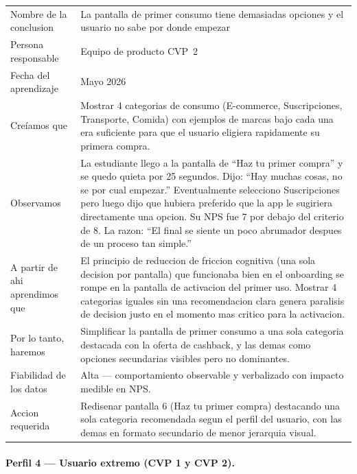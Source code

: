 \documentclass[12pt,a4paper]{article}
\begin{document}
\begin{center}
\begin{tabularx}{\linewidth}{L{3.5cm}X}
\toprule
{}
 \\
\midrule
Nombre de la conclusion & La pantalla de primer consumo tiene demasiadas opciones y el usuario no sabe por donde empezar \\
Persona responsable & Equipo de producto CVP~2 \\
Fecha del aprendizaje & Mayo 2026 \\
Creíamos que & Mostrar 4 categorias de consumo (E-commerce, Suscripciones,
Transporte, Comida) con ejemplos de marcas bajo cada una era suficiente para
que el usuario eligiera rapidamente su primera compra. \\
Observamos & La estudiante llego a la pantalla de ``Haz tu primer compra'' y
se quedo quieta por 25 segundos. Dijo: ``Hay muchas cosas, no se por cual
empezar.'' Eventualmente selecciono Suscripciones pero luego dijo que hubiera
preferido que la app le sugiriera directamente una opcion. Su NPS fue 7 por
debajo del criterio de 8. La razon: ``El final se siente un poco abrumador
despues de un proceso tan simple.'' \\
A partir de ahi aprendimos que & El principio de reduccion de friccion cognitiva
(una sola decision por pantalla) que funcionaba bien en el onboarding se rompe
en la pantalla de activacion del primer uso. Mostrar 4 categorias iguales sin
una recomendacion clara genera paralisis de decision justo en el momento mas
critico para la activacion. \\
Por lo tanto, haremos & Simplificar la pantalla de primer consumo a una sola
categoria destacada con la oferta de cashback, y las demas como opciones
secundarias visibles pero no dominantes. \\
Fiabilidad de los datos & Alta --- comportamiento observable y verbalizado con
impacto medible en NPS. \\
Accion requerida & Redisenar pantalla 6 (Haz tu primer compra) destacando una
sola categoria recomendada segun el perfil del usuario, con las demas en
formato secundario de menor jerarquia visual. \\
\bottomrule
\end{tabularx}
\end{center}

\paragraph{Perfil 4 --- Usuario extremo (CVP 1 y CVP 2).}
\end{document}
